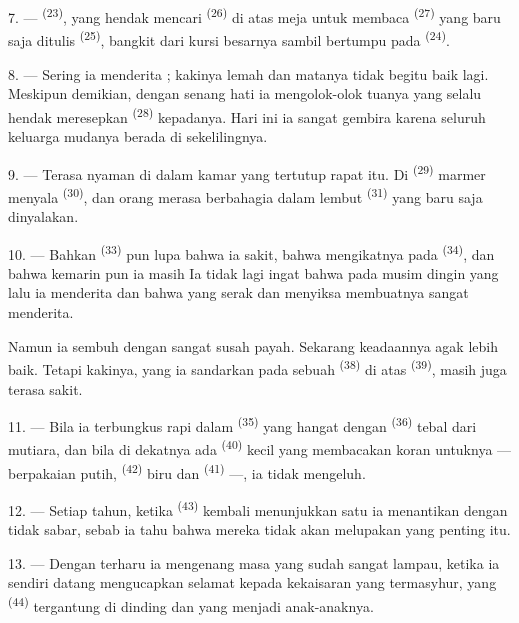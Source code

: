 7. ---  \textsuperscript{(23)}, yang hendak mencari
 \textsuperscript{(26)} di atas meja
untuk membaca  \textsuperscript{(27)} yang baru saja
ditulis  \textsuperscript{(25)}, bangkit dari kursi
besarnya sambil bertumpu pada 
\textsuperscript{(24)}.

8. --- Sering ia menderita  ; kakinya lemah dan matanya tidak begitu baik lagi.
Meskipun demikian, dengan senang hati ia mengolok-olok 
tuanya yang selalu hendak meresepkan 
\textsuperscript{(28)} kepadanya. Hari ini ia sangat gembira karena
seluruh keluarga mudanya berada di sekelilingnya.

9. --- Terasa nyaman di dalam kamar yang tertutup rapat itu. Di
 \textsuperscript{(29)} marmer menyala  \textsuperscript{(30)}, dan orang merasa berbahagia dalam
 lembut  \textsuperscript{(31)} yang baru
saja dinyalakan.

\VUsaut{4.2mm}
\VUsaut{3.0mm}

10. --- Bahkan  \textsuperscript{(33)} pun lupa bahwa ia
sakit, bahwa  mengikatnya pada  \textsuperscript{(34)}, dan bahwa kemarin pun ia masih
 Ia tidak lagi ingat bahwa pada musim
dingin yang lalu ia menderita  dan bahwa
 yang serak dan menyiksa membuatnya sangat menderita.

Namun ia sembuh dengan sangat susah payah. Sekarang keadaannya agak
lebih baik. Tetapi kakinya, yang ia sandarkan pada sebuah
 \textsuperscript{(38)} di atas 
\textsuperscript{(39)}, masih juga terasa sakit.

11. --- Bila ia terbungkus rapi dalam 
\textsuperscript{(35)} yang hangat dengan 
\textsuperscript{(36)} tebal dari mutiara, dan bila di dekatnya ada
 \textsuperscript{(40)} kecil yang
membacakan koran untuknya — berpakaian  putih,
 \textsuperscript{(42)} biru dan 
\textsuperscript{(41)} —, ia tidak mengeluh.

12. --- Setiap tahun, ketika  \textsuperscript{(43)}
kembali menunjukkan  satu  ia
menantikan  dengan tidak sabar, sebab ia tahu
bahwa mereka tidak akan melupakan  yang penting itu.

13. --- Dengan terharu ia mengenang masa yang sudah sangat lampau,
ketika ia sendiri datang mengucapkan selamat kepada 
kekaisaran yang termasyhur, yang 
\textsuperscript{(44)} tergantung di dinding dan yang menjadi
 anak-anaknya.

\VUsaut{6.0mm}
\VUfilet{22mm}
